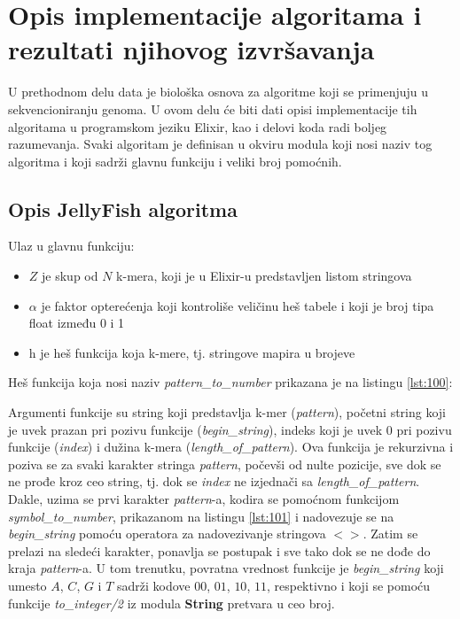 \documentclass[12pt,oneside]{memoir}
\begin{document}
\chapter{Opis implementacije algoritama i rezultati njihovog izvršavanja}

U prethodnom delu data je biološka osnova za algoritme koji se primenjuju u sekvencioniranju genoma. U ovom delu će biti dati opisi implementacije tih algoritama u programskom jeziku Elixir, kao i delovi koda radi boljeg razumevanja. Svaki algoritam je definisan u okviru modula koji nosi naziv tog algoritma i koji sadrži glavnu funkciju i veliki broj pomoćnih.

\section{Opis JellyFish algoritma}

Ulaz u glavnu funkciju:

\begin{itemize}
    \item {$Z$ je skup od $N$ k-mera, koji je u Elixir-u predstavljen listom stringova}
    \item {$\alpha$ je faktor opterećenja koji kontroliše veličinu heš tabele i koji je broj tipa float između 0 i 1}
    \item {h je heš funkcija koja k-mere, tj. stringove mapira u brojeve}
\end{itemize}

\newpage

Heš funkcija koja nosi naziv \textit{pattern\_to\_number} prikazana je na listingu \ref{lst:100}:



Argumenti funkcije su string koji predstavlja k-mer (\textit{pattern}), početni string koji je uvek prazan pri pozivu funkcije (\textit{begin\_string}), indeks  koji je uvek 0 pri pozivu funkcije (\textit{index}) i dužina k-mera (\textit{length\_of\_pattern}). Ova funkcija je rekurzivna i poziva se za svaki karakter stringa \textit{pattern}, počevši od nulte pozicije, sve dok se ne prođe kroz ceo string, tj. dok se \textit{index} ne izjednači sa \textit{length\_of\_pattern}. Dakle, uzima se prvi karakter \textit{pattern}-a, kodira se pomoćnom funkcijom \textit{symbol\_to\_number}, prikazanom na listingu \ref{lst:101} i nadovezuje se na \textit{begin\_string} pomoću operatora za nadovezivanje stringova $<>$. Zatim se prelazi na sledeći karakter, ponavlja se postupak i sve tako dok se ne dođe do kraja \textit{pattern}-a. U tom trenutku, povratna vrednost funkcije je \textit{begin\_string} koji umesto $A$, $C$, $G$ i $T$ sadrži kodove $00$, $01$, $10$, $11$, respektivno i koji se pomoću funkcije \textit{to\_integer/2} iz modula \textbf{String} pretvara u ceo broj.
\end{document}
